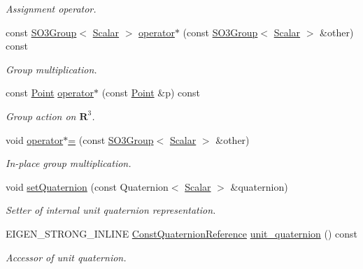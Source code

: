 \begin{DoxyCompactItemize}
\begin{DoxyCompactList}\small\item\em Assignment operator. \end{DoxyCompactList}\item 
const \hyperlink{class_sophus_1_1_s_o3_group}{S\+O3\+Group}$<$ \hyperlink{class_sophus_1_1_s_o3_group_base_a31bf31815c195b7150da8a8e8c6f0189}{Scalar} $>$ \hyperlink{class_sophus_1_1_s_o3_group_base_af3924b64a1a6c45946f80f4e88f04a6d}{operator$\ast$} (const \hyperlink{class_sophus_1_1_s_o3_group}{S\+O3\+Group}$<$ \hyperlink{class_sophus_1_1_s_o3_group_base_a31bf31815c195b7150da8a8e8c6f0189}{Scalar} $>$ \&other) const 
\begin{DoxyCompactList}\small\item\em Group multiplication. \end{DoxyCompactList}\item 
const \hyperlink{class_sophus_1_1_s_o3_group_base_a1cfbc3b3a28e1f70b3e1845716db0a1b}{Point} \hyperlink{class_sophus_1_1_s_o3_group_base_ad627562967215f7bd4ba593925b871bd}{operator$\ast$} (const \hyperlink{class_sophus_1_1_s_o3_group_base_a1cfbc3b3a28e1f70b3e1845716db0a1b}{Point} \&p) const 
\begin{DoxyCompactList}\small\item\em Group action on $ \mathbf{R}^3 $. \end{DoxyCompactList}\item 
void \hyperlink{class_sophus_1_1_s_o3_group_base_aeb9fd0d8089a51a9a0a0ad08eba1a8a0}{operator$\ast$=} (const \hyperlink{class_sophus_1_1_s_o3_group}{S\+O3\+Group}$<$ \hyperlink{class_sophus_1_1_s_o3_group_base_a31bf31815c195b7150da8a8e8c6f0189}{Scalar} $>$ \&other)
\begin{DoxyCompactList}\small\item\em In-\/place group multiplication. \end{DoxyCompactList}\item 
void \hyperlink{class_sophus_1_1_s_o3_group_base_aacf1cdcbeb6ebff5ab5f86ad015c16f9}{set\+Quaternion} (const Quaternion$<$ \hyperlink{class_sophus_1_1_s_o3_group_base_a31bf31815c195b7150da8a8e8c6f0189}{Scalar} $>$ \&quaternion)
\begin{DoxyCompactList}\small\item\em Setter of internal unit quaternion representation. \end{DoxyCompactList}\item 
E\+I\+G\+E\+N\+\_\+\+S\+T\+R\+O\+N\+G\+\_\+\+I\+N\+L\+I\+NE \hyperlink{class_sophus_1_1_s_o3_group_base_a8a5a23aee10f2850a5894b7c1f5e6654}{Const\+Quaternion\+Reference} \hyperlink{class_sophus_1_1_s_o3_group_base_ab36e91f1f0ffce4be8a5f26902216832}{unit\+\_\+quaternion} () const 
\begin{DoxyCompactList}\small\item\em Accessor of unit quaternion. \end{DoxyCompactList}\end{DoxyCompactItemize}
